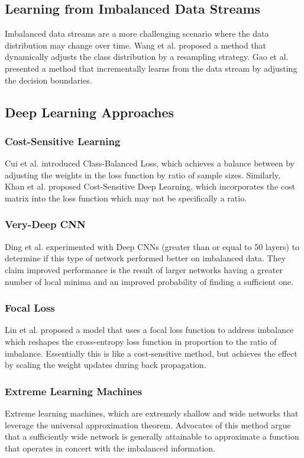 \documentclass[journal]{IEEEtran}
\begin{document}
	\subsection{Learning from Imbalanced Data Streams} 
	
	Imbalanced data streams are a more challenging scenario where the data distribution may change over time. 
	Wang et al. \cite{wang2018} proposed a method that dynamically adjusts the class distribution by a resampling strategy. 
	Gao et al. \cite{gao2015} presented a method that incrementally learns from the data stream by adjusting the decision boundaries.
	
	\subsection{Deep Learning Approaches}
	
	\subsubsection{Cost-Sensitive Learning}
	Cui et al. \cite{cui2019} introduced Class-Balanced Loss, which achieves a balance between by adjusting the weights in the loss function by ratio of sample sizes. 
	Similarly, Khan et al. \cite{khan2017} proposed Cost-Sensitive Deep Learning, which incorporates the cost matrix into the loss function which may not be specifically a ratio.	
	
	\subsubsection{Very-Deep CNN}
	Ding et al. experimented with Deep CNNs (greater than or equal to 50 layers) to determine if this type of network performed better on imbalanced data. 
	They claim improved performance is the result of larger networks having a greater number of local minima and an improved probability of finding a sufficient one.
	
	\subsubsection{Focal Loss}
	Lin et al. proposed a model that uses a focal loss function to address imbalance which reshapes the cross-entropy loss function in proportion to the ratio of imbalance.
	Essentially this is like a cost-sensitive method, but achieves the effect by scaling the weight updates during back propagation.
	
	\subsubsection{Extreme Learning Machines}
	Extreme learning machines, which are extremely shallow and wide networks that leverage the universal approximation theorem.
	Advocates of this method argue that a sufficiently wide network is generally attainable to approximate a function that operates 
	in concert with the imbalanced information.
	
\end{document}
